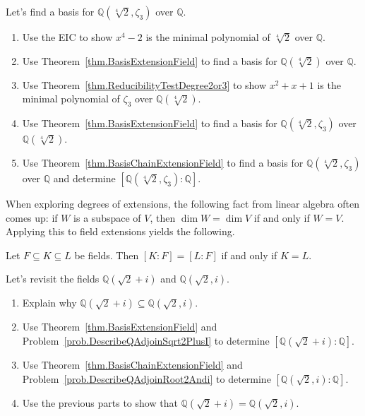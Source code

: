 \begin{problem}\label{prob.BasisQFourthRoot2AndZeta3}
Let's find a basis for $\mathbb{Q}(\sqrt[4]{2},\zeta_3)$ over $\mathbb{Q}$.
\begin{enumerate}
\item Use the EIC to show $x^4-2$ is the minimal polynomial of $\sqrt[4]{2}$ over $\mathbb{Q}$.
\item Use Theorem~\ref{thm.BasisExtensionField} to find a basis for  $\mathbb{Q}(\sqrt[4]{2})$ over $\mathbb{Q}$.
\item Use Theorem~\ref{thm.ReducibilityTestDegree2or3} to show $x^2+x+1$ is the minimal polynomial of $\zeta_3$ over $\mathbb{Q}(\sqrt[4]{2})$.
\item Use Theorem~\ref{thm.BasisExtensionField} to find a basis for  $\mathbb{Q}(\sqrt[4]{2},\zeta_3)$ over $\mathbb{Q}(\sqrt[4]{2})$.
\item Use Theorem~\ref{thm.BasisChainExtensionField} to find a basis for $\mathbb{Q}(\sqrt[4]{2},\zeta_3)$ over $\mathbb{Q}$ and determine $[\mathbb{Q}(\sqrt[4]{2},\zeta_3):\mathbb{Q}]$.
\end{enumerate}
\end{problem}

When exploring degrees of extensions, the following fact from linear algebra often comes up: if $W$ is a subspace of $V$, then $\dim W = \dim V$ if and only if $W = V$. Applying this to field extensions yields the following.

\begin{fact}
Let $F\subseteq K \subseteq L$ be fields. Then $[K:F] = [L:F]$ if and only if $K = L$.
\end{fact}

\begin{problem}
Let's revisit the fields $\mathbb{Q}(\sqrt{2}+i)$ and $\mathbb{Q}(\sqrt{2},i)$.
\begin{enumerate}
\item Explain why $\mathbb{Q}(\sqrt{2}+i)\subseteq \mathbb{Q}(\sqrt{2},i)$.
\item Use Theorem~\ref{thm.BasisExtensionField} and Problem~\ref{prob.DescribeQAdjoinSqrt2PlusI} to determine $[\mathbb{Q}(\sqrt{2}+i):\mathbb{Q}]$.
\item Use Theorem~\ref{thm.BasisChainExtensionField} and Problem~\ref{prob.DescribeQAdjoinRoot2Andi} to determine $[\mathbb{Q}(\sqrt{2},i):\mathbb{Q}]$.
\item Use the previous parts to show that $\mathbb{Q}(\sqrt{2}+i)= \mathbb{Q}(\sqrt{2},i)$.
\end{enumerate}
\end{problem}

